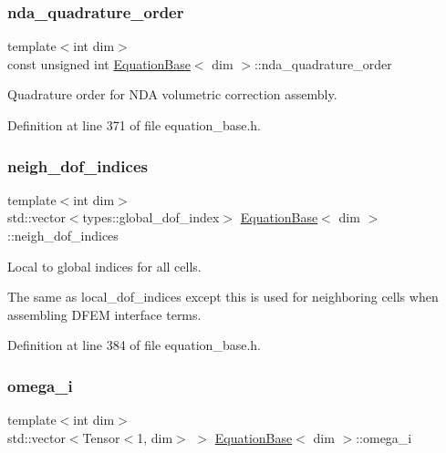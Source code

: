 \subsubsection{\texorpdfstring{nda\+\_\+quadrature\+\_\+order}{nda\_quadrature\_order}}
{\footnotesize\ttfamily template$<$int dim$>$ \\
const unsigned int \hyperlink{class_equation_base}{Equation\+Base}$<$ dim $>$\+::nda\+\_\+quadrature\+\_\+order\hspace{0.3cm}{\ttfamily [protected]}}



Quadrature order for N\+DA volumetric correction assembly. 



Definition at line 371 of file equation\+\_\+base.\+h.

\mbox{\label{class_equation_base_a94114d6debfbf1955c3c39f5330ac3c2}} 
\subsubsection{\texorpdfstring{neigh\+\_\+dof\+\_\+indices}{neigh\_dof\_indices}}
{\footnotesize\ttfamily template$<$int dim$>$ \\
std\+::vector$<$types\+::global\+\_\+dof\+\_\+index$>$ \hyperlink{class_equation_base}{Equation\+Base}$<$ dim $>$\+::neigh\+\_\+dof\+\_\+indices\hspace{0.3cm}{\ttfamily [protected]}}



Local to global indices for all cells. 

The same as local\+\_\+dof\+\_\+indices except this is used for neighboring cells when assembling D\+F\+EM interface terms. 

Definition at line 384 of file equation\+\_\+base.\+h.

\mbox{\label{class_equation_base_a46320b14358dd65c8450bba919c856d0}} 
\subsubsection{\texorpdfstring{omega\+\_\+i}{omega\_i}}
{\footnotesize\ttfamily template$<$int dim$>$ \\
std\+::vector$<$Tensor$<$1, dim$>$ $>$ \hyperlink{class_equation_base}{Equation\+Base}$<$ dim $>$\+::omega\+\_\+i\hspace{0.3cm}{\ttfamily [protected]}}



